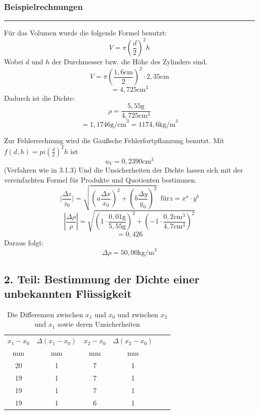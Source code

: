 \documentclass[11pt,a4paper]{article} %
\begin{document}
\subsubsection{Beispielrechnungen}

\hrule
\begin{tcolorbox}[colback=white]
Für das Volumen wurde die folgende Formel benutzt:
$$V = \pi (\frac{d}{2})^2 h$$
Wobei $d$ und $h$ der Durchmesser bzw. die Höhe des Zylinders sind. 
$$V = \pi (\frac{1,6\textrm{cm}}{2})^2\cdot2,35\textrm{cm}$$
$$ = 4,725 \textrm{cm}^3$$
Dadurch ist die Dichte:
$$\rho=\frac{5,55\textrm{g}}{4,725\textrm{cm}^3}$$
$$=1,1746\textrm{g/cm}^3=1174,6\textrm{kg/m}^3$$

Zur Fehlerrechnung wird die Gaußsche Fehlerfortpflanzung benutzt. Mit $f(d,h)=pi(\frac{d}{2})^2h$ ist
$$u_V = 0,2390 \textrm{cm}^3$$
(Verfahren wie in 3.1.3)
Und die Unsicherheiten der Dichte lassen sich mit der vereinfachten Formel für Produkte und Quotienten bestimmen. 
\begin{equation}
\vert\frac{\Delta z}{z_0}\vert = \sqrt{(a\frac{\Delta x}{x_0})^2+(b\frac{\Delta y}{y_0})^2} \; \; \textrm{für} z=x^a\cdot y^b
\end{equation}
$$|\frac{\Delta\rho}{\rho}|=\sqrt{(1\cdot\frac{0,01\textrm{g}}{5,55\textrm{g}})^2+(-1\cdot\frac{0,2\textrm{cm}^3}{4,7\textrm{cm}^3})^2}$$
$$=0,426$$
Daraus folgt:
$$\Delta\rho=50,00\textrm{kg/m}^3$$
\end{tcolorbox}

\newpage
\subsection{2. Teil: Bestimmung der Dichte einer unbekannten Flüssigkeit}

\begin{table}[ht]
	\begin{tabular*}{0.99\textwidth}{@{\extracolsep{\fill}}cccccc}
		\toprule
		$x_1-x_0$ & $\Delta(x_1-x_0)$ &  $x_2-x_0$  &  $\Delta(x_2-x_0)$  \\
		mm & mm &  mm & mm   \\
		\midrule
		20 & 1 & 7 & 1 \\
		19 & 1 & 7 & 1 \\
		19 & 1 & 7 & 1 \\
		19 & 1 & 6 & 1 \\
		
		\bottomrule
	\end{tabular*}
	\caption{Die Differenzen zwischen $x_1$ und $x_0$ und zwischen $x_2$ und $x_1$ sowie deren Unsicherheiten}
	\label{tabelle3}
\end{table}
\end{document}
